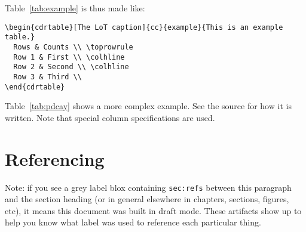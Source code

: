 \noindent Table~\ref{tab:example} is thus made like:

\begin{verbatim}
\begin{cdrtable}[The LoT caption]{cc}{example}{This is an example table.}
  Rows & Counts \\ \toprowrule
  Row 1 & First \\ \colhline
  Row 2 & Second \\ \colhline
  Row 3 & Third \\ 
\end{cdrtable}
\end{verbatim}

Table~\ref{tab:pdcay} shows a more complex example.
See the source for how it is written.
Note that special column specifications are used.



\section{Referencing}
\label{sec:refs}

Note: if you see a grey label blox containing \texttt{sec:refs}
between this paragraph and the section heading (or in general
elsewhere in chapters, sections, figures, etc), it means this document
was built in draft mode.  
These artifacts show up to help you know what label was used to
reference each particular thing.

